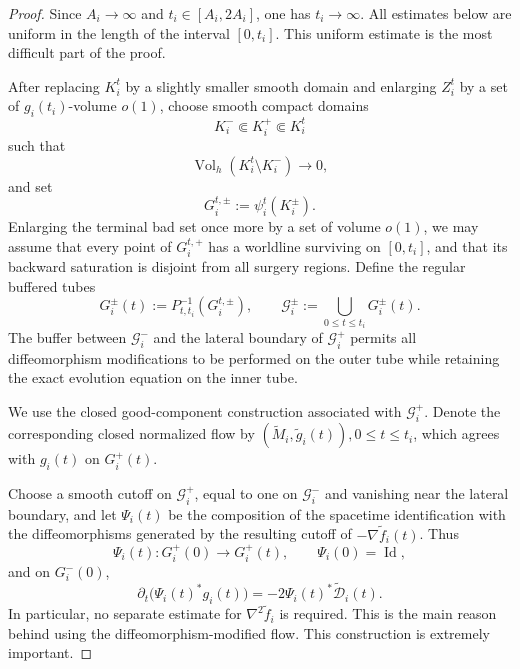 \documentclass{amsart}
\begin{document}
\begin{proof}
Since \(A_i\to\infty\) and \(t_i\in[A_i,2A_i]\), one has
\(t_i\to\infty\). All estimates below are uniform in the length of the
interval \([0,t_i]\). This uniform estimate is the most difficult part of the proof. 

\noindent After replacing \(K_i^t\) by a slightly smaller smooth domain and
enlarging \(Z_i^t\) by a set of \(g_i(t_i)\)-volume \(o(1)\), choose
smooth compact domains
\[
        K_i^-\Subset K_i^+\Subset K_i^t
\]
such that
\[
        \operatorname{Vol}_h(K_i^t\setminus K_i^-)\to0,
\]
and set
\[
        G_i^{t,\pm}:=\psi_i^t(K_i^\pm).
\]
Enlarging the terminal bad set once more by a set of volume \(o(1)\), we
may assume that every point of \(G_i^{t,+}\) has a worldline surviving
on \([0,t_i]\), and that its backward saturation is disjoint from all
surgery regions. Define the regular buffered tubes
\[
        G_i^\pm(t):=P_{t,t_i}^{-1}(G_i^{t,\pm}),
        \qquad
        \mathcal G_i^\pm
        :=
        \bigcup_{0\leq t\leq t_i}G_i^\pm(t).
\]
The buffer between \(\mathcal G_i^-\) and the lateral boundary of
\(\mathcal G_i^+\) permits all diffeomorphism modifications to be
performed on the outer tube while retaining the exact evolution
equation on the inner tube.

\noindent We use the closed good-component construction associated with
\(\mathcal G_i^+\). Denote the corresponding closed normalized flow by
$(\widetilde M_i,\widetilde g_i(t)),
0\leq t\leq t_i$,
which agrees with \(g_i(t)\) on \(G_i^+(t)\).

\noindent Choose a smooth cutoff on \(\mathcal G_i^+\), equal to one on
\(\mathcal G_i^-\) and vanishing near the lateral boundary, and let
\(\Psi_i(t)\) be the composition of the spacetime identification with
the diffeomorphisms generated by the resulting cutoff of
\(-\nabla\widetilde f_i(t)\). Thus
\[
        \Psi_i(t):G_i^+(0)\longrightarrow G_i^+(t),
        \qquad
        \Psi_i(0)=\operatorname{Id},
\]
and on \(G_i^-(0)\),
\begin{equation}
\label{eq:modified-flow-metric-evolution}
        \partial_t\bigl(\Psi_i(t)^*g_i(t)\bigr)
        =
        -2\Psi_i(t)^*\widetilde{\mathcal D}_i(t).
\end{equation}
In particular, no separate estimate for
\(\nabla^2\widetilde f_i\) is required. This is the main reason behind using the diffeomorphism-modified flow. This construction is extremely important. 


\end{proof}
\end{document}
